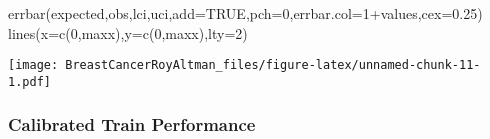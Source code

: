 \documentclass[
]{article}
\newenvironment{Shaded}{\begin{snugshade}}{\end{snugshade}}
\newcommand{\AttributeTok}[1]{\textcolor[rgb]{0.77,0.63,0.00}{#1}}
\newcommand{\ConstantTok}[1]{\textcolor[rgb]{0.00,0.00,0.00}{#1}}
\newcommand{\DecValTok}[1]{\textcolor[rgb]{0.00,0.00,0.81}{#1}}
\newcommand{\FloatTok}[1]{\textcolor[rgb]{0.00,0.00,0.81}{#1}}
\newcommand{\FunctionTok}[1]{\textcolor[rgb]{0.00,0.00,0.00}{#1}}
\newcommand{\NormalTok}[1]{#1}
\newcommand{\SpecialCharTok}[1]{\textcolor[rgb]{0.00,0.00,0.00}{#1}}
\newcommand{\StringTok}[1]{\textcolor[rgb]{0.31,0.60,0.02}{#1}}
\begin{document}
\begin{Shaded}
\begin{Highlighting}[]
\FunctionTok{errbar}\NormalTok{(expected,obs,lci,uci,}\AttributeTok{add=}\ConstantTok{TRUE}\NormalTok{,}\AttributeTok{pch=}\DecValTok{0}\NormalTok{,}\AttributeTok{errbar.col=}\DecValTok{1}\SpecialCharTok{+}\NormalTok{values,}\AttributeTok{cex=}\FloatTok{0.25}\NormalTok{)}
\FunctionTok{lines}\NormalTok{(}\AttributeTok{x=}\FunctionTok{c}\NormalTok{(}\DecValTok{0}\NormalTok{,maxx),}\AttributeTok{y=}\FunctionTok{c}\NormalTok{(}\DecValTok{0}\NormalTok{,maxx),}\AttributeTok{lty=}\DecValTok{2}\NormalTok{)}
\end{Highlighting}
\end{Shaded}

\texttt{[image: BreastCancerRoyAltman\_files/figure-latex/unnamed-chunk-11-1.pdf]}

\hypertarget{calibrated-train-performance}{%
\subsubsection{Calibrated Train
Performance}\label{calibrated-train-performance}}

\begin{Shaded}
\end{Shaded}
\end{document}
